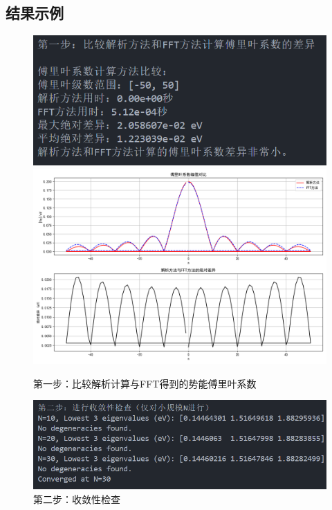 \subsection{结果示例}
\begin{figure}[H]
    \centering
    \includegraphics[width=1.0\textwidth]{Problem_1/figs/1_vq_coeff.png}
    \includegraphics[width=1.0\textwidth]{Problem_1/figs/vq_coeff.png}
    \caption{第一步：比较解析计算与FFT得到的势能傅里叶系数}
\end{figure}

\begin{figure}[H]
    \centering
    \includegraphics[width=1.0\textwidth]{Problem_1/figs/2_converge.png}
    \caption{第二步：收敛性检查}
\end{figure}

